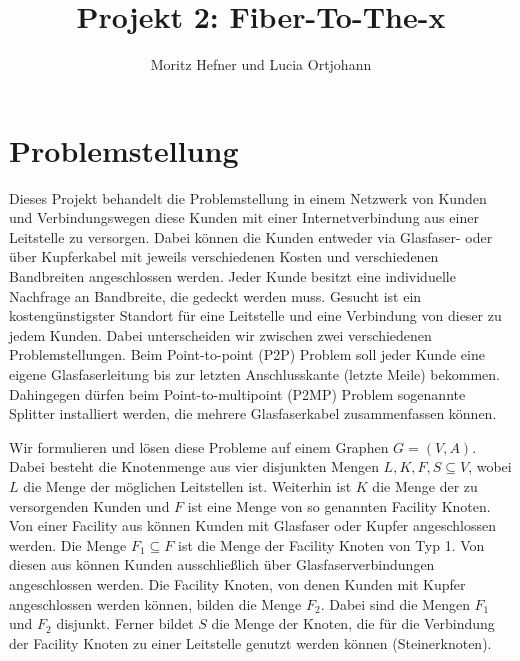\documentclass[11pt,a4paper]{article}
\title{Projekt 2: Fiber-To-The-x}
\author{Moritz Hefner und Lucia Ortjohann}
\theoremstyle{my_th_style1}
\begin{document}
\maketitle
\thispagestyle{empty}
\newpage
\tableofcontents
\thispagestyle{empty}
\newpage
\setcounter{page}{1}



\section{Problemstellung}

Dieses Projekt behandelt die Problemstellung in einem Netzwerk von Kunden und Verbindungswegen diese Kunden mit einer Internetverbindung aus einer Leitstelle zu versorgen.
Dabei k\"onnen die Kunden entweder via Glasfaser- oder \"uber Kupferkabel mit jeweils verschiedenen Kosten und verschiedenen Bandbreiten angeschlossen werden.
Jeder Kunde besitzt eine individuelle Nachfrage an Bandbreite, die gedeckt werden muss.
Gesucht ist ein kosteng\"unstigster Standort f\"ur eine Leitstelle und eine Verbindung von dieser zu jedem Kunden.
Dabei unterscheiden wir zwischen zwei verschiedenen Problemstellungen.
Beim Point-to-point (P2P) Problem soll jeder Kunde eine eigene Glasfaserleitung bis zur letzten Anschlusskante (letzte Meile) bekommen.
Dahingegen dürfen beim Point-to-multipoint (P2MP) Problem sogenannte Splitter installiert werden, die mehrere Glasfaserkabel zusammenfassen k\"onnen.
 
Wir formulieren und lösen diese Probleme auf einem Graphen \(G=(V,A)\).
Dabei besteht die Knotenmenge aus vier disjunkten Mengen $L,K,F,S \subseteq V$, wobei $L$ die Menge der m\"oglichen Leitstellen ist. Weiterhin ist $K$ die Menge der zu versorgenden Kunden und $F$ ist eine Menge von so genannten Facility Knoten.
Von einer Facility aus können Kunden mit Glasfaser oder Kupfer angeschlossen werden.
Die Menge $F_1 \subseteq F$ ist die Menge der Facility Knoten von Typ 1.
Von diesen aus können Kunden ausschließlich über Glasfaserverbindungen angeschlossen werden.
Die Facility Knoten, von denen Kunden mit Kupfer angeschlossen werden können, bilden die Menge $F_2$. Dabei sind die Mengen $F_1$ und $F_2$ disjunkt.
Ferner bildet $S$ die Menge der Knoten, die für die Verbindung der Facility Knoten zu einer Leitstelle genutzt werden k\"onnen (Steinerknoten). 
\end{document}
